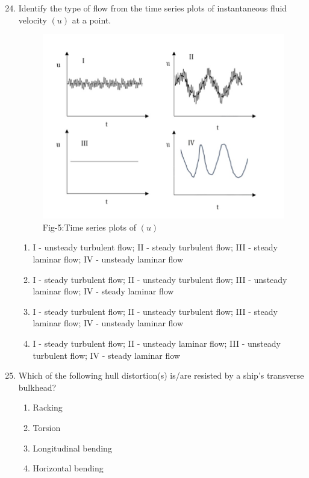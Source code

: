 \documentclass[journal]{IEEEtran}
\theoremstyle{remark}
\begin{document}
\begin{enumerate}[itemsep=1em]
\setcounter{enumi}{23}
\item Identify the type of flow from the time series plots of instantaneous fluid velocity $(u)$ at a point. 
\begin{figure}[H]
    \centering
    \includegraphics[width=0.5\columnwidth]{figs/fig-5.jpeg}
    \caption*{Fig-5:Time series plots of $(u)$}
    \label{fig-5}
\end{figure}

\newpage
\vspace*{0.25cm}
\begin{enumerate}[leftmargin=2.5em, labelsep=0.5em, itemsep=0.5em]
      \item I - unsteady turbulent flow; II - steady turbulent flow; III - steady laminar flow; IV - unsteady laminar flow 
      \item I - steady turbulent flow; II - unsteady turbulent flow; III - unsteady laminar flow; IV - steady laminar flow 
      \item I - steady turbulent flow; II - unsteady turbulent flow; III - steady laminar flow; IV - unsteady laminar flow 
      \item I - steady turbulent flow; II - unsteady laminar flow; III - unsteady turbulent flow; IV - steady laminar flow 
\end{enumerate}

\end{enumerate}

\begin{enumerate}[itemsep=1em]
\setcounter{enumi}{24}
\item Which of the following hull distortion(s) is/are resisted by a ship's transverse bulkhead?
\begin{enumerate}[leftmargin=2.5em, labelsep=0.5em, itemsep=0.5em]
       \item Racking
       \item Torsion
       \item Longitudinal bending
       \item Horizontal bending
\end{enumerate}
\end{enumerate}
\end{document}
